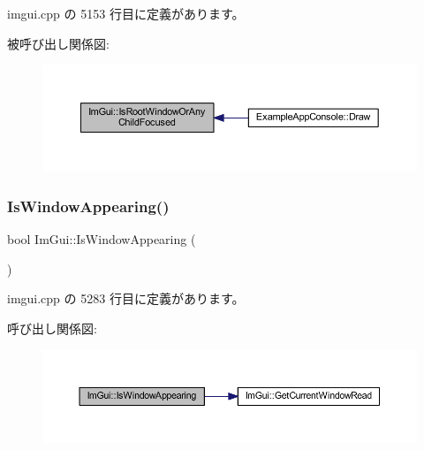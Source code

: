  imgui.\+cpp の 5153 行目に定義があります。

被呼び出し関係図\+:\nopagebreak
\begin{figure}[H]
\begin{center}
\leavevmode
\includegraphics[width=350pt]{namespace_im_gui_ad7175b87a80da527fb5ba5bc75993091_icgraph}
\end{center}
\end{figure}
\mbox{\label{namespace_im_gui_a99fd14154aae264087d471132e56a42e}} 
\subsubsection{\texorpdfstring{Is\+Window\+Appearing()}{IsWindowAppearing()}}
{\footnotesize\ttfamily bool Im\+Gui\+::\+Is\+Window\+Appearing (\begin{DoxyParamCaption}{ }\end{DoxyParamCaption})}



 imgui.\+cpp の 5283 行目に定義があります。

呼び出し関係図\+:\nopagebreak
\begin{figure}[H]
\begin{center}
\leavevmode
\includegraphics[width=350pt]{namespace_im_gui_a99fd14154aae264087d471132e56a42e_cgraph}
\end{center}
\end{figure}
\mbox{\label{namespace_im_gui_a2a6492aea9013c0078fc530a66e11768}} 
